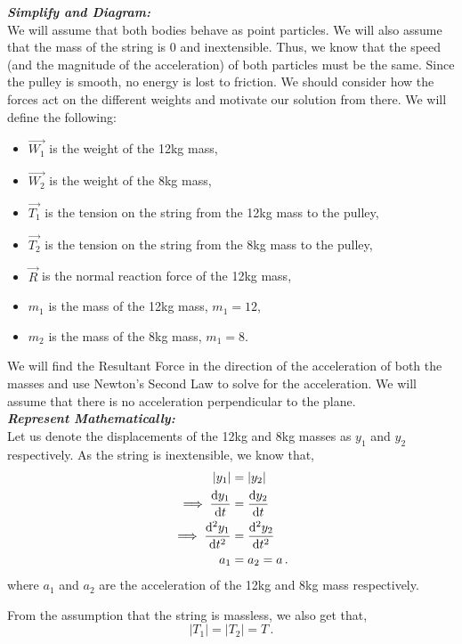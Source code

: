 \begin{subquestions}
\begin{subsubquestions}
	
	\textbf{\textit{Simplify and Diagram:}} \\
	We will assume that both bodies behave as point particles. We will also assume that the mass of the string is 0 and inextensible. Thus, we know that the speed (and the magnitude of the acceleration) of both particles must be the same. Since the pulley is smooth, no energy is lost to friction. We should consider how the forces act on the different weights and motivate our solution from there. We will define the following:
	\begin{itemize}
		\item $\vec{W_1}$ is the weight of the 12kg mass,
		\item $\vec{W_2}$ is the weight of the 8kg mass,
		\item $\vec{T_1}$ is the tension on the string from the 12kg mass to the pulley,
		\item $\vec{T_2}$ is the tension on the string from the 8kg mass to the pulley,
		\item $\vec{R}$ is the normal reaction force of the 12kg mass,
		\item $m_1$ is the mass of the 12kg mass, $m_1=12$,
		\item $m_2$ is the mass of the 8kg mass, $m_1=8$.
	\end{itemize}
	We will find the Resultant Force in the direction of the acceleration of both the masses and use Newton's Second Law to solve for the acceleration. We will assume that there is no acceleration perpendicular to the plane.\\
	
	
	\textbf{\textit{Represent Mathematically:}} \\ 
	Let us denote the displacements of the 12kg and 8kg masses as $y_1$ and $y_2$ respectively. As the string is inextensible, we know that,
	\begin{align}
		|y_1| & = |y_2| \nonumber \\
		\implies \frac{\mathrm{d}y_1}{\mathrm{d}t} & = \frac{\mathrm{d}y_2}{\mathrm{d}t} \nonumber \\
		\implies \frac{\mathrm{d}^2y_1}{\mathrm{d}t^2} & = \frac{\mathrm{d}^2y_2}{\mathrm{d}t^2} \nonumber \\
		a_1 & = a_2 = a \,. \label{2006:q5:AccEqn}
	\end{align}
	where $a_1$ and $a_2$ are the acceleration of the 12kg and 8kg mass respectively.
	
	From the assumption that the string is massless, we also get that,
	\begin{equation}
		|T_1| = |T_2| = T \,. \label{2006:q5:TensEqn}
	\end{equation}
	

\end{subsubquestions}
\end{subquestions}
